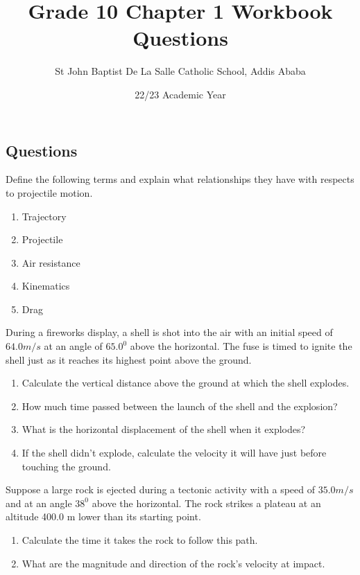 \documentclass[12pt,addpoints]{exam}
\author{St John Baptist De La Salle Catholic School, Addis Ababa}
\date{22/23 Academic Year}
\begin{document}
	\title{Grade 10 Chapter 1 Workbook Questions}
	\maketitle
	
	\begin{center}
		\subsection*{Questions}
	\end{center}
	
	
	\begin{questions}
		\question Define the following terms and explain what relationships they have with respects to projectile motion.
		\begin{enumerate}[label=(\roman*)]
			\item Trajectory
			\item Projectile
			\item Air resistance
			\item Kinematics
			\item Drag
		\end{enumerate}
		\question During a fireworks display, a shell is shot into the air with an initial speed of $64.0 m/s$ at an angle of $65.0^0$ above the horizontal. The fuse is timed to ignite the shell just as it reaches its highest point above the ground.
		\begin{enumerate}[label=(\roman*)]
			\item  Calculate the vertical distance above the ground at which the shell explodes.
			\item  How much time passed between the launch of the shell and the explosion?
			\item  What is the horizontal displacement of the shell when it explodes?
			\item  If the shell didn't explode, calculate the velocity it will have just before touching the ground.
		\end{enumerate}
		\question Suppose a large rock is ejected during a tectonic activity with a speed of $35.0 m/s$ and at an angle $38^0$ above the horizontal. The rock strikes a plateau at an altitude 400.0 m lower than its starting point. 
		\begin{enumerate}[label=(\roman*)]
			\item Calculate the time it takes the rock to follow this path.
			\item What are the magnitude and direction of the rock’s velocity at impact.

\end{enumerate}
\end{questions}
\end{document}
